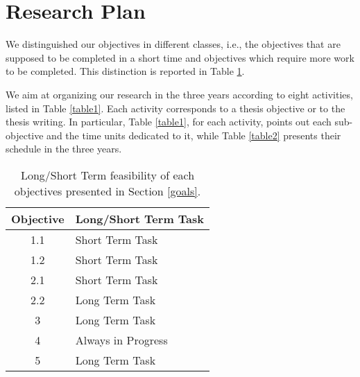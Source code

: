 \section{Research Plan}\label{researchplan}
We distinguished our objectives in different classes, i.e., the objectives that are supposed to be completed in a short time and objectives which require more work to be completed. This distinction is reported in Table \ref{tab:completed}.

We aim at organizing our research in the three years according to eight activities, listed in Table \ref{table1}. Each activity corresponds to a thesis objective or to the thesis writing. In particular, Table \ref{table1}, for each activity, points out each sub-objective and the time units dedicated to it, while Table \ref{table2} presents their schedule in the three years.





\begin{table}[h]
    \centering    
    \begin{tabular}{|c|p{5cm}|}
    \hline
    \textbf{Objective} & \textbf{Long/Short Term Task} \\ \hline
    1.1 & Short Term Task\\ \hline
    1.2 & Short Term Task\\ \hline
    2.1 & Short Term Task\\ \hline
    2.2 & Long Term Task \\ \hline
    3 & Long Term Task \\ \hline
    4   & Always in Progress \\ \hline
    5   & Long Term Task \\ \hline
    \end{tabular}
    \caption{Long/Short Term feasibility of each objectives presented in Section \ref{goals}. \label{tab:completed}}
    \end{table}

